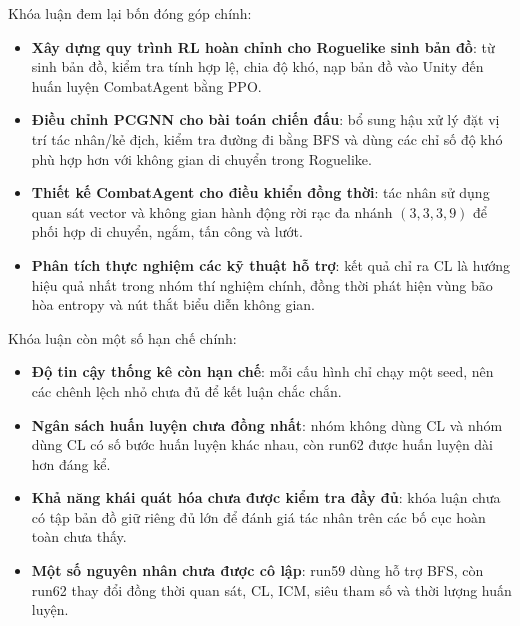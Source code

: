 Khóa luận đem lại bốn đóng góp chính:

\renewcommand{\labelitemi}{$-$}
\begin{itemize}
    \item \textbf{Xây dựng quy trình RL hoàn chỉnh cho Roguelike sinh bản đồ}: từ sinh bản đồ, kiểm tra tính hợp lệ, chia độ khó, nạp bản đồ vào Unity đến huấn luyện CombatAgent bằng PPO.

    \item \textbf{Điều chỉnh PCGNN cho bài toán chiến đấu}: bổ sung hậu xử lý đặt vị trí tác nhân/kẻ địch, kiểm tra đường đi bằng BFS và dùng các chỉ số độ khó phù hợp hơn với không gian di chuyển trong Roguelike.

    \item \textbf{Thiết kế CombatAgent cho điều khiển đồng thời}: tác nhân sử dụng quan sát vector và không gian hành động rời rạc đa nhánh $(3,3,3,9)$ để phối hợp di chuyển, ngắm, tấn công và lướt.

    \item \textbf{Phân tích thực nghiệm các kỹ thuật hỗ trợ}: kết quả chỉ ra CL là hướng hiệu quả nhất trong nhóm thí nghiệm chính, đồng thời phát hiện vùng bão hòa entropy và nút thắt biểu diễn không gian.
\end{itemize}

\vspace{0.5cm}

Khóa luận còn một số hạn chế chính:

\renewcommand{\labelitemi}{$-$}
\begin{itemize}
    \item \textbf{Độ tin cậy thống kê còn hạn chế}: mỗi cấu hình chỉ chạy một seed, nên các chênh lệch nhỏ chưa đủ để kết luận chắc chắn.

    \item \textbf{Ngân sách huấn luyện chưa đồng nhất}: nhóm không dùng CL và nhóm dùng CL có số bước huấn luyện khác nhau, còn run62 được huấn luyện dài hơn đáng kể.

    \item \textbf{Khả năng khái quát hóa chưa được kiểm tra đầy đủ}: khóa luận chưa có tập bản đồ giữ riêng đủ lớn để đánh giá tác nhân trên các bố cục hoàn toàn chưa thấy.

    \item \textbf{Một số nguyên nhân chưa được cô lập}: run59 dùng hỗ trợ BFS, còn run62 thay đổi đồng thời quan sát, CL, ICM, siêu tham số và thời lượng huấn luyện.
\end{itemize}

